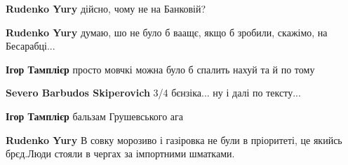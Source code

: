 \begin{itemize}
\begin{itemize}
 
\textbf{Rudenko Yury} дійсно, чому не на Банковій?

 
\textbf{Rudenko Yury} думаю, шо не було б ваащє, якщо б зробили, скажімо, на Бесарабці...

 
\textbf{Ігор Тамплієр} просто мовчкі можна було б спалить нахуй та й по тому

 
\textbf{Severo Barbudos Skiperovich} 3/4 бєнзіка... ну і далі по тексту...

 
\textbf{Ігор Тамплієр} бальзам Грушевського ага

 
\textbf{Rudenko Yury} В совку морозиво і газіровка не були в пріоритеті, це якийсь брєд.Люди стояли в чергах за імпортними шматками.

 

\end{itemize}
\end{itemize}
